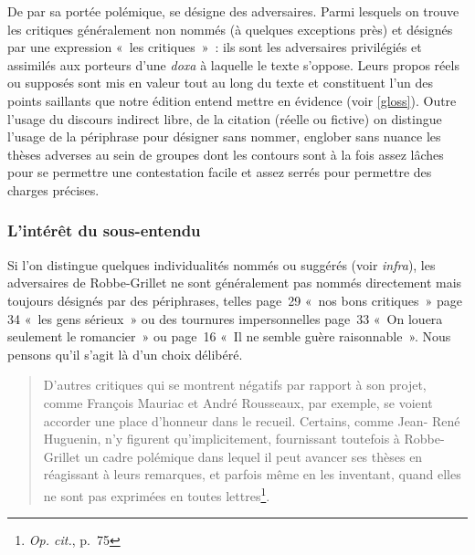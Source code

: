 \documentclass[12pt, a4paper]{article}
\begin{document}
De par sa portée polémique, \punr{} se désigne des adversaires. Parmi lesquels on trouve les critiques généralement non nommés (à quelques exceptions près) et désignés par une expression «~les critiques~»~: ils sont les adversaires privilégiés et assimilés aux porteurs d'une \textit{doxa} à laquelle le texte s'oppose. Leurs propos réels ou supposés sont mis en valeur tout au long du texte et constituent l'un des points saillants que notre édition entend mettre en évidence (voir \ref{gloss}). Outre l'usage du discours indirect libre, de la citation (réelle ou fictive) on distingue l'usage de la périphrase pour désigner sans nommer, englober sans nuance les thèses adverses au sein de groupes dont les contours sont à la fois assez lâches pour se permettre une contestation facile et assez serrés pour permettre des charges précises.


\subsubsection{L'intérêt du sous-entendu}
Si l'on distingue quelques individualités nommés ou suggérés (voir \textit{infra}), les adversaires de Robbe-Grillet ne sont généralement pas nommés directement mais toujours désignés par des périphrases, telles page~29 «~nos bons critiques~» page 34 «~les gens sérieux~» ou des tournures impersonnelles page~33 «~On louera seulement le romancier~» ou page~16 «~Il ne semble guère raisonnable~». Nous pensons qu'il s'agit là d'un choix délibéré.

\begin{quote}
    D'autres critiques qui se montrent négatifs par rapport à son projet,
comme François Mauriac et André Rousseaux, par exemple, se voient
accorder une place d’honneur dans le recueil. Certains, comme Jean-
René Huguenin, n’y figurent qu’implicitement, fournissant toutefois à
Robbe-Grillet un cadre polémique dans lequel il peut avancer ses
thèses en réagissant à leurs remarques, et parfois même en les inventant,
quand elles ne sont pas exprimées en toutes lettres\footnote{\textit{Op. cit.}, p.~75}.
\end{quote}
\end{document}
